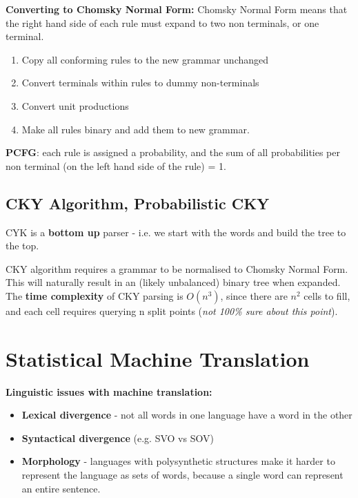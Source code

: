 \documentclass[]{article}
\begin{document}
	\textbf{Converting to Chomsky Normal Form:}
	Chomsky Normal Form means that the right hand side of each rule must expand to two non terminals, or one terminal. \cite{jurafsky2018speech}
	
	\begin{enumerate}
		\item Copy all conforming rules to the new grammar unchanged
		\item Convert terminals within rules to dummy non-terminals
		\item Convert unit productions
		\item Make all rules binary and add them to new grammar.
	\end{enumerate}
	

	\textbf{PCFG}: each rule is assigned a probability, and the sum of all probabilities per non terminal (on the left hand side of the rule) = 1.

	
	\subsection{CKY Algorithm, Probabilistic CKY}
	
	CYK is a \textbf{bottom up} parser - i.e. we start with the words and build the tree to the top. 
	
	CKY algorithm requires a grammar to be normalised to Chomsky Normal Form. This will naturally result in an (likely unbalanced) binary tree when expanded. \\
	
	The \textbf{time complexity} of CKY parsing is $O(n^3)$, since there are $n^2$ cells to fill, and each cell requires querying n split points (\textit{not 100\% sure about this point}). 
	
    \clearpage
	\section{Statistical Machine Translation}
	
	\textbf{Linguistic issues with machine translation:}
	
	\begin{itemize}
	 \item \textbf{Lexical divergence} - not all words in one language have a word in the other
	 \item \textbf{Syntactical divergence} (e.g. SVO vs SOV)
	 \item \textbf{Morphology} - languages with polysynthetic structures make it harder to represent the language as sets of words, because a single word can represent an entire sentence.   
	\end{itemize}
	
\end{document}
